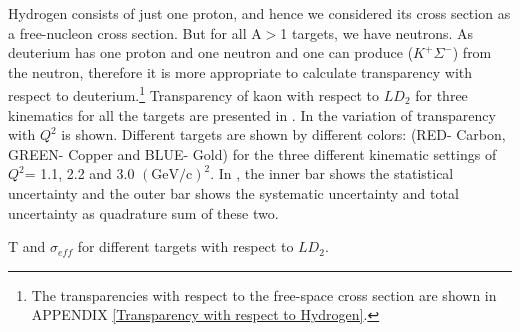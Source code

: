 %
Hydrogen consists of just one proton, and hence we considered its cross section as a free-nucleon cross section. But for all A$>$1 targets, we have neutrons. As deuterium has one proton and one neutron and one can produce ($K^+\Sigma^-$) from the neutron, therefore it is more appropriate to calculate transparency with respect to deuterium.\footnote{The transparencies with respect to the free-space cross section are shown in APPENDIX \ref{Transparency with respect to Hydrogen}.} Transparency of kaon with respect to $LD_2$ for three kinematics for all the targets are presented in . In  the variation of transparency with $Q^2$ is shown. Different targets are shown by different colors: (RED- Carbon, GREEN- Copper and BLUE- Gold) for the three different kinematic settings of $Q^2$= 1.1, 2.2 and 3.0 $(\mathrm{GeV/c})^2$. In , the inner bar shows the statistical uncertainty and the outer bar shows the systematic uncertainty and total uncertainty as quadrature sum of these two.

\begin{table}
  \caption[T and $\sigma_{eff}$ for different targets with respect to $LD_2$.]{\label{tab:t_4}T and $\sigma_{eff}$ for different targets with respect to $LD_2$.}

\end{table}

